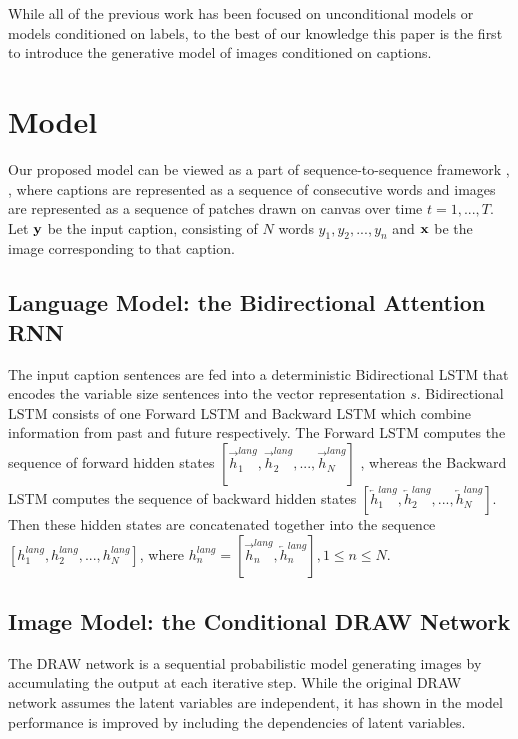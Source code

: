 \documentclass{article} %
\newcommand{\hlang}{h^{lang}}
\newcommand{\icaption}{{\bf{y}}}
\newcommand{\oimage}{{\bf{x}}}
\begin{document}
While all of the previous work has been focused on unconditional models or models conditioned on labels, to the best of our knowledge this paper is the first to introduce the generative model of images conditioned on captions.

\section{Model}
Our proposed model can be viewed as a part of sequence-to-sequence framework \citep{ilya_mt}, \citep{cho_mt}, \citep{nitish_video} where captions are represented as a sequence of consecutive words and images are represented as a sequence of patches drawn on canvas over time $t=1,...,T$. Let $\icaption$ be the input caption, consisting of $N$ words $y_{1}, y_{2}, ..., y_{n}$ and $\oimage$ be the image corresponding to that caption.

\subsection{Language Model: the Bidirectional Attention RNN}
\label{sec:lang}
The input caption sentences are fed into a deterministic Bidirectional LSTM\cite{} that encodes the variable size sentences into the vector representation $s$. Bidirectional LSTM consists of one Forward LSTM and Backward LSTM which combine information from past and future respectively. The Forward LSTM computes the sequence of forward hidden states $[\overrightarrow{h}^{lang}_{1}, \overrightarrow{h}^{lang}_{2}, ..., \overrightarrow{h}^{lang}_{N}]$ , whereas the Backward LSTM computes the sequence of backward hidden states $[\overleftarrow{h}^{lang}_{1}, \overleftarrow{h}^{lang}_{2}, ..., \overleftarrow{h}^{lang}_{N}]$. Then these hidden states are concatenated together into the sequence $[\hlang_{1}, \hlang_{2}, ..., \hlang_{N}]$, where $\hlang_{n} = [\overrightarrow{h}^{lang}_{n}, \overleftarrow{h}^{lang}_{n}], 1\leq n\leq N$.





\subsection{Image Model: the Conditional DRAW Network}

The DRAW network \cite{gregor_draw} is a sequential probabilistic model generating images by accumulating the output at each iterative step. While the original DRAW network assumes the latent variables are independent, it has shown in \citep{bachman_sdm} the model performance is improved by including the dependencies of latent variables. 
\end{document}
